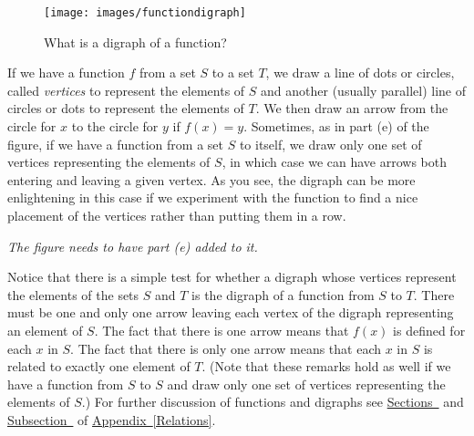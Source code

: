 \documentclass[10pt,]{book}
\theoremstyle{plain}
\theoremstyle{definition}
\theoremstyle{definition}
\numberwithin{equation}{chapter}
\begin{document}
\begin{figure}
\centering
\texttt{[image: images/functiondigraph]}
\caption{What is a digraph of a function?\label{functiondigraphs}}
\end{figure}
If we have a function \(f\) from a set \(S\) to a set \(T\), we draw a line of dots or circles, called \emph{vertices} to represent the elements of \(S\) and another (usually parallel) line of circles or dots to represent the elements of \(T\). We then draw an arrow from the circle for \(x\) to the circle for \(y\) if \(f(x) = y\). Sometimes, as in part (e) of the figure, if we have a function from a set \(S\) to itself, we draw only one set of vertices representing the elements of \(S\), in which case we can have arrows both entering and leaving a given vertex. As you see, the digraph can be more enlightening in this case if we experiment with the function to find a nice placement of the vertices rather than putting them in a row.%
\par
\emph{The figure needs to have part (e) added to it.}%
\par
Notice that there is a simple test for whether a digraph whose vertices represent the elements of the sets \(S\) and \(T\) is the digraph of a function from \(S\) to \(T\). There must be one and only one arrow leaving each vertex of the digraph representing an element of \(S\). The fact that there is one arrow means that \(f(x)\) is defined for each \(x\) in \(S\). The fact that there is only one arrow means that each \(x\) in \(S\) is related to exactly one element of \(T\). (Note that these remarks hold as well if we have a function from \(S\) to \(S\) and draw only one set of vertices representing the elements of \(S\).) For further discussion of functions and digraphs see \hyperref[functionrelation]{Sections~} and \hyperref[relationdigraph]{Subsection~} of {\hyperref[Relations]{Appendix~\ref{Relations}}}.%
\end{document}
